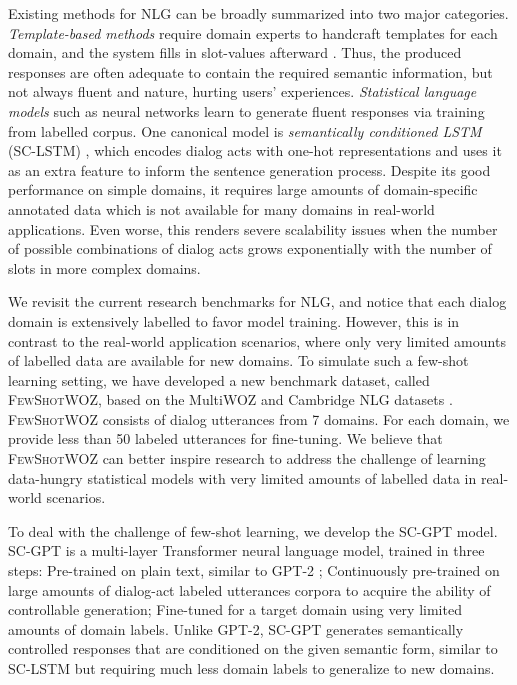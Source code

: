 \documentclass[11pt,a4paper]{article}
\newcommand{\data}{\textsc{FewShotWOZ}}
\begin{document}
Existing methods for NLG can be broadly summarized into two major categories.
 {\it Template-based methods} require domain experts to handcraft templates for each domain, and the system fills in slot-values afterward \citep{rule,halogen}. Thus, the produced responses are often adequate to contain the required semantic information, but not always fluent and nature, hurting users' experiences.
 {\it Statistical language models} such as neural networks \citep{gao2019neural} learn to generate fluent responses via training from labelled corpus. One canonical model is {\it semantically conditioned LSTM} (SC-LSTM) \citep{wen-etal-2015-semantically}, which encodes dialog acts with one-hot representations and uses it as an extra feature to inform the sentence generation process. Despite its good performance on simple domains, it requires large amounts of domain-specific annotated data which is not available for many domains in real-world applications. Even worse, this renders severe scalability issues when the number of possible combinations of dialog acts grows exponentially with the number of slots in more complex domains. 













We revisit the current research benchmarks for NLG, and notice that each dialog domain is extensively labelled to favor model training. However, this is in contrast to the real-world application scenarios, where only very limited amounts of labelled data are available for new domains. To simulate such a few-shot learning setting, we have developed a new benchmark dataset, called \data{}, based on the MultiWOZ \citep{budzianowski2018multiwoz} and Cambridge NLG datasets \citep{rnnlg}. 
\data{} consists of dialog utterances from 7 domains. For each domain, we provide less than 50 labeled utterances for fine-tuning.  We believe that \data{} can better inspire  research to address the challenge of learning  data-hungry statistical models with very limited amounts of labelled data in real-world scenarios. 


To deal with the challenge of few-shot learning, we develop the SC-GPT model.  
SC-GPT is a multi-layer Transformer neural language model, trained in three steps:
 Pre-trained on plain text, similar to GPT-2 \citep{gpt2}; 
 Continuously pre-trained on large amounts of dialog-act labeled utterances corpora to acquire the ability of controllable generation;
 Fine-tuned for a target domain using very limited amounts of domain labels.
Unlike GPT-2, SC-GPT generates semantically controlled responses that are conditioned on the given semantic form, similar to SC-LSTM but requiring much less domain labels to generalize to new domains. 
\end{document}
